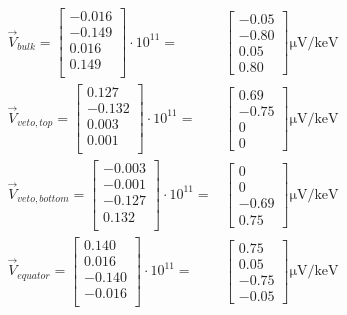 \begin{align}
\label{eq:fid38-cabling-sensitivity}
\vec{V}_{bulk}
=
\begin{bmatrix}
  -0.016 \\ -0.149 \\ 0.016 \\ 0.149\\
\end{bmatrix}
\cdot 10^{11}
= &
\begin{bmatrix}
-0.05 \\ -0.80 \\ 0.05 \\ 0.80
\end{bmatrix}
\si{\micro\volt\per\kilo\eV}
\\
\vec{V}_{veto,top}
=
\begin{bmatrix}
  0.127 \\ -0.132 \\ 0.003 \\ 0.001\\
\end{bmatrix}
\cdot 10^{11}
= &
\begin{bmatrix}
0.69 \\ -0.75 \\ 0 \\ 0
\end{bmatrix}
\si{\micro\volt\per\kilo\eV}
\\
\vec{V}_{veto,bottom}
=
\begin{bmatrix}
  -0.003 \\ -0.001 \\ -0.127 \\ 0.132\\
\end{bmatrix}
\cdot 10^{11}
= &
\begin{bmatrix}
0 \\ 0 \\ -0.69 \\ 0.75
\end{bmatrix}
\si{\micro\volt\per\kilo\eV}
\\
\vec{V}_{equator}
=
\begin{bmatrix}
  0.140 \\ 0.016 \\ -0.140 \\ -0.016\\
\end{bmatrix}
\cdot 10^{11}
= &
\begin{bmatrix}
0.75 \\ 0.05 \\ -0.75 \\ -0.05
\end{bmatrix}
\si{\micro\volt\per\kilo\eV}
\end{align}


